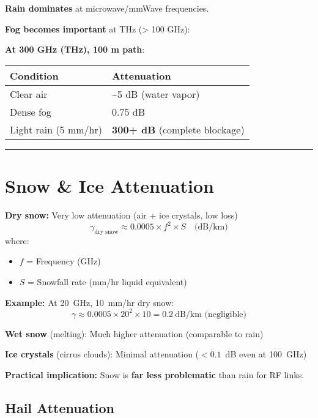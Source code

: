 \textbf{Rain dominates} at microwave/mmWave frequencies.

\textbf{Fog becomes important} at THz (\textgreater{} 100 GHz):

\textbf{At 300 GHz (THz), 100 m path}:

{\def\LTcaptype{} %
\begin{longtable}[]{@{}ll@{}}
\toprule\noalign{}
Condition & Attenuation \\
\midrule\noalign{}
\endhead
\bottomrule\noalign{}
\endlastfoot
Clear air & \textasciitilde5 dB (water vapor) \\
Dense fog & 0.75 dB \\
Light rain (5 mm/hr) & \textbf{300+ dB} (complete blockage) \\
\end{longtable}
}

\begin{center}\rule{0.5\linewidth}{0.5pt}\end{center}

\section{Snow \& Ice Attenuation}

\textbf{Dry snow:} Very low attenuation (air + ice crystals, low loss)
\begin{equation}
\gamma_{\text{dry snow}} \approx 0.0005 \times f^2 \times S \quad \text{(dB/km)}
\end{equation}
where:
\begin{itemize}
\item $f$ = Frequency (GHz)
\item $S$ = Snowfall rate (mm/hr liquid equivalent)
\end{itemize}

\textbf{Example:} At 20~GHz, 10~mm/hr dry snow:
\begin{equation}
\gamma \approx 0.0005 \times 20^2 \times 10 = 0.2~\text{dB/km (negligible)}
\end{equation}

\textbf{Wet snow} (melting): Much higher attenuation (comparable to rain)

\textbf{Ice crystals} (cirrus clouds): Minimal attenuation ($< 0.1$~dB even at 100~GHz)

\textbf{Practical implication:} Snow is \textbf{far less problematic} than rain for RF links.

\subsection{Hail Attenuation}\label{hail-attenuation}

